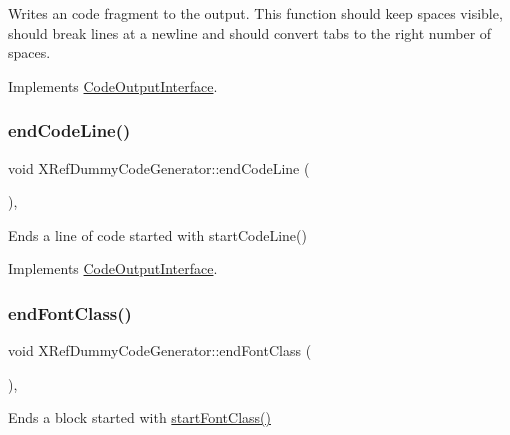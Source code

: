 Writes an code fragment to the output. This function should keep spaces visible, should break lines at a newline and should convert tabs to the right number of spaces. 

Implements \mbox{\hyperlink{class_code_output_interface_aa29a5eedda08596ace50ed5b59c8ae7f}{Code\+Output\+Interface}}.

\mbox{\label{class_x_ref_dummy_code_generator_a6b4a0fd7e9d9b39e05bf65f7dcc1021e}} 
\subsubsection{\texorpdfstring{endCodeLine()}{endCodeLine()}}
{\footnotesize\ttfamily void X\+Ref\+Dummy\+Code\+Generator\+::end\+Code\+Line (\begin{DoxyParamCaption}{ }\end{DoxyParamCaption})\hspace{0.3cm}{\ttfamily [inline]}, {\ttfamily [virtual]}}

Ends a line of code started with start\+Code\+Line() 

Implements \mbox{\hyperlink{class_code_output_interface_afac5763eafc78f93b82691fb9a6dcff7}{Code\+Output\+Interface}}.

\mbox{\label{class_x_ref_dummy_code_generator_a9a502e533ffc65e8db2b84e07a0d468a}} 
\subsubsection{\texorpdfstring{endFontClass()}{endFontClass()}}
{\footnotesize\ttfamily void X\+Ref\+Dummy\+Code\+Generator\+::end\+Font\+Class (\begin{DoxyParamCaption}{ }\end{DoxyParamCaption})\hspace{0.3cm}{\ttfamily [inline]}, {\ttfamily [virtual]}}

Ends a block started with \mbox{\hyperlink{class_x_ref_dummy_code_generator_a5c53cb36c03f583b7b236e482a0a6693}{start\+Font\+Class()}} 

